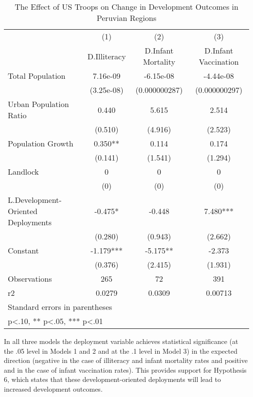 \documentclass[12pt]{article}
\begin{document}
\begin{doublespace}
\begin{table}[htbp]\centering
\def\sym#1{\ifmmode^{#1}\else\(^{#1}\)\fi}
\caption{The Effect of US Troops on Change in Development Outcomes in Peruvian Regions}
\begin{tabular}{l*{3}{c}}
\hline\hline
                    &\multicolumn{1}{c}{(1)}&\multicolumn{1}{c}{(2)}&\multicolumn{1}{c}{(3)}\\
                    &\multicolumn{1}{c}{D.Illiteracy}&\multicolumn{1}{c}{D.Infant Mortality}&\multicolumn{1}{c}{D.Infant Vaccination}\\
\hline
Total Population    &    7.16e-09   &   -6.15e-08   &   -4.44e-08   \\
                    &  (3.25e-08)   &(0.000000287)   &(0.000000297)   \\
[1em]
Urban Population Ratio&       0.440   &       5.615   &       2.514   \\
                    &     (0.510)   &     (4.916)   &     (2.523)   \\
[1em]
Population Growth   &       0.350** &       0.114   &       0.174   \\
                    &     (0.141)   &     (1.541)   &     (1.294)   \\
[1em]
Landlock            &           0   &           0   &           0   \\
                    &         (0)   &         (0)   &         (0)   \\
[1em]
L.Development-Oriented Deployments&      -0.475*  &      -0.448   &       7.480***\\
                    &     (0.280)   &     (0.943)   &     (2.662)   \\
[1em]
Constant            &      -1.179***&      -5.175** &      -2.373   \\
                    &     (0.376)   &     (2.415)   &     (1.931)   \\
\hline
Observations        &         265   &          72   &         391   \\
r2                  &      0.0279   &      0.0309   &     0.00713   \\
\hline\hline
\multicolumn{4}{l}{\footnotesize Standard errors in parentheses}\\
\multicolumn{4}{l}{\footnotesize * p<.10, ** p<.05, *** p<.01}\\
\end{tabular}
\end{table}

In all three models the deployment variable achieves statistical significance (at the .05 level in Models 1 and 2 and at the .1 level in Model 3) in the expected direction (negative in the case of illiteracy and infant mortality rates and positive and in the case of infant vaccination rates).  This provides support for Hypothesis 6, which states that these development-oriented deployments will lead to increased development outcomes.  





\end{doublespace}
\end{document}
